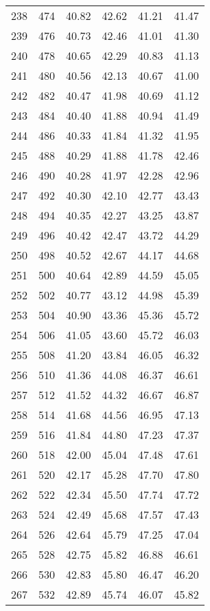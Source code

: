 \begin{longtable}{rrllll}
		238 & 474 & 40.82 & 42.62 & 41.21 & 41.47 \\ 
		239 & 476 & 40.73 & 42.46 & 41.01 & 41.30 \\ 
		240 & 478 & 40.65 & 42.29 & 40.83 & 41.13 \\ 
		241 & 480 & 40.56 & 42.13 & 40.67 & 41.00 \\ 
		242 & 482 & 40.47 & 41.98 & 40.69 & 41.12 \\ 
		243 & 484 & 40.40 & 41.88 & 40.94 & 41.49 \\ 
		244 & 486 & 40.33 & 41.84 & 41.32 & 41.95 \\ 
		245 & 488 & 40.29 & 41.88 & 41.78 & 42.46 \\ 
		246 & 490 & 40.28 & 41.97 & 42.28 & 42.96 \\ 
		247 & 492 & 40.30 & 42.10 & 42.77 & 43.43 \\ 
		248 & 494 & 40.35 & 42.27 & 43.25 & 43.87 \\ 
		249 & 496 & 40.42 & 42.47 & 43.72 & 44.29 \\ 
		250 & 498 & 40.52 & 42.67 & 44.17 & 44.68 \\ 
		251 & 500 & 40.64 & 42.89 & 44.59 & 45.05 \\ 
		252 & 502 & 40.77 & 43.12 & 44.98 & 45.39 \\ 
		253 & 504 & 40.90 & 43.36 & 45.36 & 45.72 \\ 
		254 & 506 & 41.05 & 43.60 & 45.72 & 46.03 \\ 
		255 & 508 & 41.20 & 43.84 & 46.05 & 46.32 \\ 
		256 & 510 & 41.36 & 44.08 & 46.37 & 46.61 \\ 
		257 & 512 & 41.52 & 44.32 & 46.67 & 46.87 \\ 
		258 & 514 & 41.68 & 44.56 & 46.95 & 47.13 \\ 
		259 & 516 & 41.84 & 44.80 & 47.23 & 47.37 \\ 
		260 & 518 & 42.00 & 45.04 & 47.48 & 47.61 \\ 
		261 & 520 & 42.17 & 45.28 & 47.70 & 47.80 \\ 
		262 & 522 & 42.34 & 45.50 & 47.74 & 47.72 \\ 
		263 & 524 & 42.49 & 45.68 & 47.57 & 47.43 \\ 
		264 & 526 & 42.64 & 45.79 & 47.25 & 47.04 \\ 
		265 & 528 & 42.75 & 45.82 & 46.88 & 46.61 \\ 
		266 & 530 & 42.83 & 45.80 & 46.47 & 46.20 \\ 
		267 & 532 & 42.89 & 45.74 & 46.07 & 45.82 \\ 

\end{longtable}

